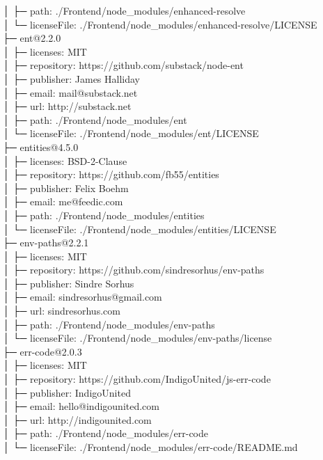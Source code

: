 │  ├─ path: ./Frontend/node\_modules/enhanced-resolve\\
│  └─ licenseFile: ./Frontend/node\_modules/enhanced-resolve/LICENSE\\
├─ ent@2.2.0\\
│  ├─ licenses: MIT\\
│  ├─ repository: https://github.com/substack/node-ent\\
│  ├─ publisher: James Halliday\\
│  ├─ email: mail@substack.net\\
│  ├─ url: http://substack.net\\
│  ├─ path: ./Frontend/node\_modules/ent\\
│  └─ licenseFile: ./Frontend/node\_modules/ent/LICENSE\\
├─ entities@4.5.0\\
│  ├─ licenses: BSD-2-Clause\\
│  ├─ repository: https://github.com/fb55/entities\\
│  ├─ publisher: Felix Boehm\\
│  ├─ email: me@feedic.com\\
│  ├─ path: ./Frontend/node\_modules/entities\\
│  └─ licenseFile: ./Frontend/node\_modules/entities/LICENSE\\
├─ env-paths@2.2.1\\
│  ├─ licenses: MIT\\
│  ├─ repository: https://github.com/sindresorhus/env-paths\\
│  ├─ publisher: Sindre Sorhus\\
│  ├─ email: sindresorhus@gmail.com\\
│  ├─ url: sindresorhus.com\\
│  ├─ path: ./Frontend/node\_modules/env-paths\\
│  └─ licenseFile: ./Frontend/node\_modules/env-paths/license\\
├─ err-code@2.0.3\\
│  ├─ licenses: MIT\\
│  ├─ repository: https://github.com/IndigoUnited/js-err-code\\
│  ├─ publisher: IndigoUnited\\
│  ├─ email: hello@indigounited.com\\
│  ├─ url: http://indigounited.com\\
│  ├─ path: ./Frontend/node\_modules/err-code\\
│  └─ licenseFile: ./Frontend/node\_modules/err-code/README.md\\
